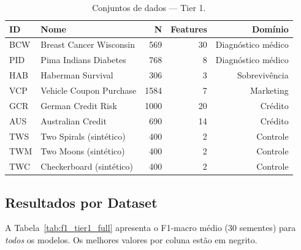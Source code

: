 \documentclass[12pt,a4paper]{article}
\begin{document}
\begin{table}[H]
\centering
\caption{Conjuntos de dados --- Tier 1.}
\label{tab:datasets}
\begin{tabular}{llrrr}
\toprule
\textbf{ID} & \textbf{Nome} & \textbf{N} & \textbf{Features} & \textbf{Domínio} \\
\midrule
BCW & Breast Cancer Wisconsin & 569 & 30 & Diagnóstico médico \\
PID & Pima Indians Diabetes   & 768 &  8 & Diagnóstico médico \\
HAB & Haberman Survival       & 306 &  3 & Sobrevivência \\
VCP & Vehicle Coupon Purchase &1584 &  7 & Marketing \\
GCR & German Credit Risk      &1000 & 20 & Crédito \\
AUS & Australian Credit       & 690 & 14 & Crédito \\
TWS & Two Spirals (sintético) & 400 &  2 & Controle \\
TWM & Two Moons (sintético)   & 400 &  2 & Controle \\
TWC & Checkerboard (sintético)& 400 &  2 & Controle \\
\bottomrule
\end{tabular}
\end{table}

\subsection{Resultados por Dataset}

A Tabela~\ref{tab:f1_tier1_full} apresenta o F1-macro médio (30 sementes) para
\emph{todos} os modelos. Os melhores valores por coluna estão em negrito.
\end{document}
